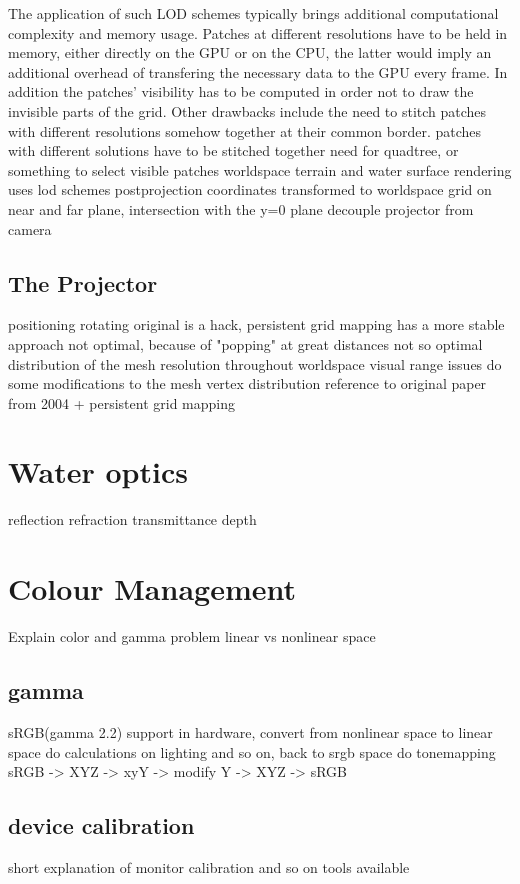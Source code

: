 The application of such LOD schemes typically brings additional computational
complexity and memory usage. Patches at different resolutions have to be held
in memory, either directly on the GPU or on the CPU, the latter would imply an
additional overhead of transfering the necessary data to the GPU every frame.
In addition the patches' visibility has to be computed in order not to draw the
invisible parts of the grid. Other drawbacks include the need to stitch patches
with different resolutions somehow together at their common border. \FIXME{}
patches with different solutions have to be stitched together
need for quadtree, or something to select visible patches
worldspace terrain and water surface rendering
uses lod schemes
postprojection coordinates transformed to worldspace
grid on near and far plane, intersection with the y=0 plane
decouple projector from camera

\subsection{The Projector}
positioning
rotating
original is a hack, persistent grid mapping has a more stable approach
not optimal, because of "popping" at great distances
not so optimal distribution of the mesh resolution throughout worldspace
visual range issues
do some modifications to the mesh vertex distribution
reference to original paper from 2004 + persistent grid mapping

\section{Water optics}
reflection
refraction
transmittance
depth

\section{Colour Management}
Explain color and gamma problem
linear vs nonlinear space

\subsection{gamma}
sRGB(gamma 2.2) support in hardware, convert from nonlinear space to linear
space do calculations on lighting and so on, back to srgb space
do tonemapping sRGB -> XYZ -> xyY -> modify Y -> XYZ -> sRGB

\subsection{device calibration}
short explanation of monitor calibration and so on
tools available
